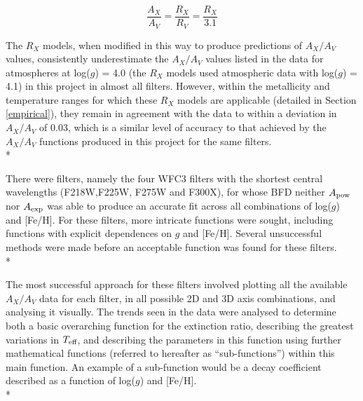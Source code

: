 \documentclass[12pt, a4paper]{report}
\begin{document}
\begin{equation}
\frac{A_{X}}{A_{V}} = \frac{R_{X}}{R_{V}} = \frac{R_{X}}{3.1}
\label{convert_Rx_to_Ax}
\end{equation}

The $R_{X}$ models, when modified in this way to produce predictions of $A_{X}/A_{V}$ values, consistently underestimate the $A_{X}/A_{V}$ values listed in the data for atmospheres at log($g$) = 4.0 (the $R_{X}$ models used atmospheric data with log($g$) = 4.1) in this project in almost all filters. However, within the metallicity and temperature ranges for which these $R_{X}$ models are applicable (detailed in Section \ref{empirical}), they remain in agreement with the data to within a deviation in $A_{X}/A_{V}$ of 0.03, which is a similar level of accuracy to that achieved by the $A_{X}/A_{V}$ functions produced in this project for the same filters.\\*

There were filters, namely the four WFC3 filters with the shortest central wavelengths (F218W,F225W, F275W and F300X), for whose BFD neither $A_{\textnormal{pow}}$ nor $A_{\textnormal{exp}}$ was able to produce an accurate fit across all combinations of log($g$) and [Fe/H]. For these filters, more intricate functions were sought, including functions with explicit dependences on $g$ and [Fe/H]. Several unsuccessful methods were made before an acceptable function was found for these filters.\\*

The most successful approach for these filters involved plotting all the available $A_{X}/A_{V}$ data for each filter, in all possible 2D and 3D axis combinations, and analysing it visually. The trends seen in the data were analysed to determine both a basic overarching function for the extinction ratio, describing the greatest variations in $T_{\textnormal{eff}}$, and describing the parameters in this function using further mathematical functions (referred to hereafter as ``sub-functions'') within this main function. An example of a sub-function would be a decay coefficient described as a function of log($g$) and [Fe/H].\\*
\end{document}
